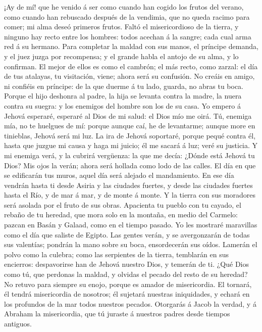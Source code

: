  ¡Ay de mí! que he venido á ser como cuando han cogido los
frutos del verano, como cuando han rebuscado después de la vendimia, que
no queda racimo para comer; mi alma deseó primeros frutos.
 Faltó el misericordioso de la tierra, y ninguno hay recto
entre los hombres: todos acechan á la sangre; cada cual arma red á su
hermano.  Para completar la maldad con sus manos, el
príncipe demanda, y el juez juzga por recompensa; y el grande habla el
antojo de su alma, y lo confirman.  El mejor de ellos es
como el cambrón; el más recto, como zarzal: el día de tus atalayas, tu
visitación, viene; ahora será su confusión.  No creáis en
amigo, ni confiéis en príncipe: de la que duerme á tu lado, guarda, no
abras tu boca.  Porque el hijo deshonra al padre, la hija
se levanta contra la madre, la nuera contra su suegra: y los enemigos
del hombre son los de su casa.  Yo empero á Jehová
esperaré, esperaré al Dios de mi salud: el Dios mío me oirá.
 Tú, enemiga mía, no te huelgues de mí: porque aunque caí,
he de levantarme; aunque more en tinieblas, Jehová será mi luz.
 La ira de Jehová soportaré, porque pequé contra él, hasta
que juzgue mi causa y haga mi juicio; él me sacará á luz; veré su
justicia.  Y mi enemiga verá, y la cubrirá vergüenza: la
que me decía: ¿Dónde está Jehová tu Dios? Mis ojos la verán; ahora será
hollada como lodo de las calles.  El día en que se
edificarán tus muros, aquel día será alejado el mandamiento.
 En ese día vendrán hasta ti desde Asiria y las ciudades
fuertes, y desde las ciudades fuertes hasta el Río, y de mar á mar, y de
monte á monte.  Y la tierra con sus moradores será
asolada por el fruto de sus obras.  Apacienta tu pueblo
con tu cayado, el rebaño de tu heredad, que mora solo en la montaña, en
medio del Carmelo: pazcan en Basán y Galaad, como en el tiempo pasado.
 Yo les mostraré maravillas como el día que saliste de
Egipto.  Las gentes verán, y se avergonzarán de todas sus
valentías; pondrán la mano sobre su boca, ensordecerán sus oídos.
 Lamerán el polvo como la culebra; como las serpientes de
la tierra, temblarán en sus encierros: despavorirse han de Jehová
nuestro Dios, y temerán de ti.  ¿Qué Dios como tú, que
perdonas la maldad, y olvidas el pecado del resto de su heredad? No
retuvo para siempre su enojo, porque es amador de misericordia.
 El tornará, él tendrá misericordia de nosotros; él
sujetará nuestras iniquidades, y echará en los profundos de la mar todos
nuestros pecados.  Otorgarás á Jacob la verdad, y á
Abraham la misericordia, que tú juraste á nuestros padres desde tiempos
antiguos.
